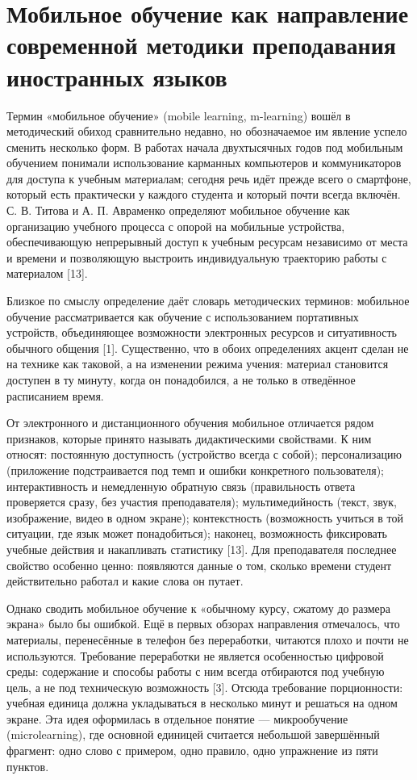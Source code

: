 \documentclass[11pt,a4paper,openany]{report}
\begin{document}
\section{Мобильное обучение как направление современной методики преподавания иностранных языков}

Термин «мобильное обучение» (mobile learning, m-learning) вошёл в методический обиход сравнительно недавно, но обозначаемое им явление успело сменить несколько форм. В работах начала двухтысячных годов под мобильным обучением понимали использование карманных компьютеров и коммуникаторов для доступа к учебным материалам; сегодня речь идёт прежде всего о смартфоне, который есть практически у каждого студента и который почти всегда включён. С. В. Титова и А. П. Авраменко определяют мобильное обучение как организацию учебного процесса с опорой на мобильные устройства, обеспечивающую непрерывный доступ к учебным ресурсам независимо от места и времени и позволяющую выстроить индивидуальную траекторию работы с материалом [13].

Близкое по смыслу определение даёт словарь методических терминов: мобильное обучение рассматривается как обучение с использованием портативных устройств, объединяющее возможности электронных ресурсов и ситуативность обычного общения [1]. Существенно, что в обоих определениях акцент сделан не на технике как таковой, а на изменении режима учения: материал становится доступен в ту минуту, когда он понадобился, а не только в отведённое расписанием время.

От электронного и дистанционного обучения мобильное отличается рядом признаков, которые принято называть дидактическими свойствами. К ним относят: постоянную доступность (устройство всегда с собой); персонализацию (приложение подстраивается под темп и ошибки конкретного пользователя); интерактивность и немедленную обратную связь (правильность ответа проверяется сразу, без участия преподавателя); мультимедийность (текст, звук, изображение, видео в одном экране); контекстность (возможность учиться в той ситуации, где язык может понадобиться); наконец, возможность фиксировать учебные действия и накапливать статистику [13]. Для преподавателя последнее свойство особенно ценно: появляются данные о том, сколько времени студент действительно работал и какие слова он путает.

Однако сводить мобильное обучение к «обычному курсу, сжатому до размера экрана» было бы ошибкой. Ещё в первых обзорах направления отмечалось, что материалы, перенесённые в телефон без переработки, читаются плохо и почти не используются. Требование переработки не является особенностью цифровой среды: содержание и способы работы с ним всегда отбираются под учебную цель, а не под техническую возможность [3]. Отсюда требование порционности: учебная единица должна укладываться в несколько минут и решаться на одном экране. Эта идея оформилась в отдельное понятие — микрообучение (microlearning), где основной единицей считается небольшой завершённый фрагмент: одно слово с примером, одно правило, одно упражнение из пяти пунктов.
\end{document}
